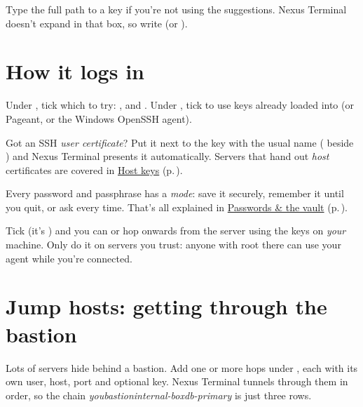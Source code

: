 
\begin{headsup}
Type the full path to a key if you're not using the suggestions. Nexus Terminal doesn't expand \code{\textasciitilde}
in that box, so write  (or ).
\end{headsup}

\section{How it logs in}

Under , tick which  to try: ,  and
. Under , tick  to use keys already
loaded into  (or Pageant, or the Windows OpenSSH agent).

Got an SSH \emph{user certificate}? Put it next to the key with the usual name ( beside
) and Nexus Terminal presents it automatically. Servers that hand out \emph{host} certificates are
covered in \hyperref[ch:hostkeys]{Host keys} (p.\,\pageref{ch:hostkeys}).

Every password and passphrase has a \emph{mode}: save it securely, remember it until you quit, or ask every time.
That's all explained in \hyperref[ch:secrets]{Passwords \& the vault} (p.\,\pageref{ch:secrets}).

\begin{protip}
Tick  (it's ) and you can  or hop onwards from the server using
the keys on \emph{your} machine. Only do it on servers you trust: anyone with root there can use your agent while
you're connected.
\end{protip}

\section{Jump hosts: getting through the bastion}

Lots of servers hide behind a bastion. Add one or more hops under , each with its own user, host,
port and optional key. Nexus Terminal tunnels through them in order, so the chain
\textit{you\then bastion\then internal-box\then db-primary} is just three rows.

